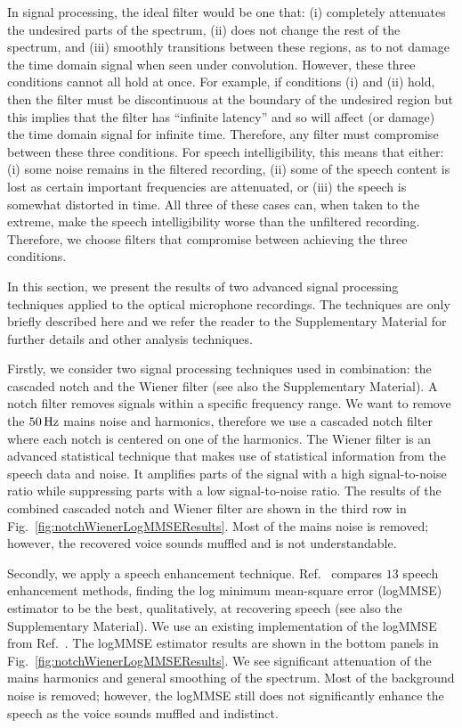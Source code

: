 \documentclass[paper-main.tex]{subfiles}
\begin{document}
In signal processing, the ideal filter would be one that:
(i) completely attenuates the undesired parts of the spectrum, 
(ii) does not change the rest of the spectrum, and 
(iii) smoothly transitions between these regions, as to not damage the time domain signal when seen under convolution. 
However, these three conditions cannot all hold at once. 
For example, if conditions (i) and (ii) hold, then the filter must be discontinuous at the boundary of the undesired region but this implies that the filter has ``infinite latency'' and so will affect (or damage) the time domain signal for infinite time.\cite{10.5555/151045}
Therefore, any filter must compromise between these three conditions. 
For speech intelligibility, this means that either: (i) some noise remains in the filtered recording, (ii) some of the speech content is lost as certain important frequencies are attenuated, or (iii) the speech is somewhat distorted in time.
All three of these cases can, when taken to the extreme, make the speech intelligibility worse than the unfiltered recording. 
Therefore, we choose filters that compromise between achieving the three conditions.


In this section, we present the results of two advanced signal processing techniques applied to the optical microphone recordings. 
The techniques are only briefly described here and we refer the reader to the Supplementary Material for further details and other analysis techniques. 


Firstly, we consider two signal processing techniques used in combination: the cascaded notch and the Wiener filter (see also the Supplementary Material). 
A notch filter removes signals within a specific frequency range. 
We want to remove the $50\,{\rm Hz}$ mains noise and harmonics, therefore we use a cascaded notch filter where each notch is centered on one of the harmonics. 
The Wiener filter is an advanced statistical technique that makes use of statistical information from the speech data and noise. 
It amplifies parts of the signal with a high signal-to-noise ratio while suppressing parts with a low signal-to-noise ratio. 
The results of the combined cascaded notch and Wiener filter are shown in the third row in Fig.~\ref{fig:notchWienerLogMMSEResults}. 
Most of the mains noise is removed; however, the recovered voice sounds muffled and is not understandable. 


Secondly, we apply a speech enhancement technique. 
Ref.~\cite{SubjectiveComparison} compares $13$ speech enhancement methods, finding the log minimum mean-square error (logMMSE) estimator to be the best, qualitatively, at recovering speech (see also the Supplementary Material). 
We use an existing implementation of the logMMSE from Ref.~\cite{logmmse}.  
The logMMSE estimator results are shown in the bottom panels in Fig.~\ref{fig:notchWienerLogMMSEResults}. 
We see significant attenuation of the mains harmonics and general smoothing of the spectrum. 
Most of the background noise is removed; however, the logMMSE still does not significantly enhance the speech as the voice sounds muffled and indistinct.
\end{document}
